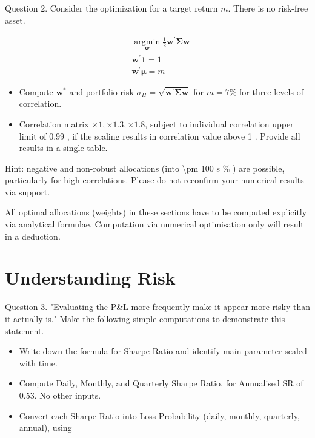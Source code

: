\documentclass[10pt]{article}
\begin{document}
Question 2. Consider the optimization for a target return $m$. There is no risk-free asset.

$$
\begin{aligned}
& \underset{\boldsymbol{w}}{\operatorname{argmin}} \frac{1}{2} \boldsymbol{w}^{\prime} \boldsymbol{\Sigma} \boldsymbol{w} \\
& \boldsymbol{w}^{\prime} \mathbf{1}=1 \\
& \boldsymbol{w}^{\prime} \boldsymbol{\mu}=m
\end{aligned}
$$

\begin{itemize}
  \item Compute $\mathbf{w}^{*}$ and portfolio risk $\sigma_{\Pi}=\sqrt{\boldsymbol{w}^{\prime} \boldsymbol{\Sigma} \boldsymbol{w}}$ for $m=7 \%$ for three levels of correlation.

  \item Correlation matrix $\times 1, \times 1.3, \times 1.8$, subject to individual correlation upper limit of 0.99 , if the scaling results in correlation value above 1 . Provide all results in a single table.

\end{itemize}

Hint: negative and non-robust allocations (into \textbackslash pm 100 s $\%$ ) are possible, particularly for high correlations. Please do not reconfirm your numerical results via support.

All optimal allocations (weights) in these sections have to be computed explicitly via analytical formulae. Computation via numerical optimisation only will result in a deduction.

\section*{Understanding Risk}
Question 3. "Evaluating the P\&L more frequently make it appear more risky than it actually is." Make the following simple computations to demonstrate this statement.

\begin{itemize}
  \item Write down the formula for Sharpe Ratio and identify main parameter scaled with time.

  \item Compute Daily, Monthly, and Quarterly Sharpe Ratio, for Annualised SR of 0.53. No other inputs.

  \item Convert each Sharpe Ratio into Loss Probability (daily, monthly, quarterly, annual), using

\end{itemize}
\end{document}
